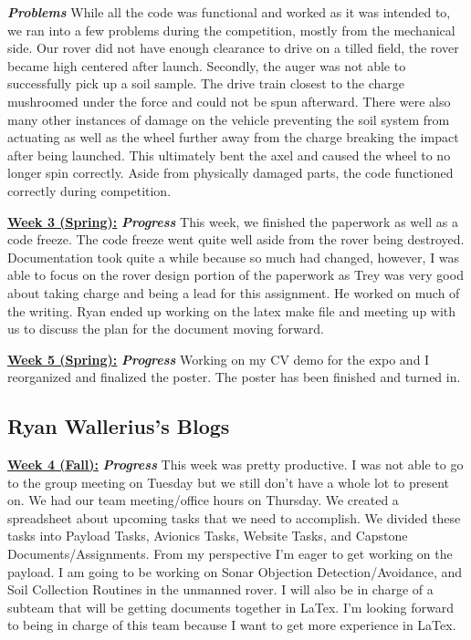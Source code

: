 \documentclass[onecolumn, draftclsnofoot, 10pt, compsoc]{IEEEtran}
\begin{document}
\textbf{\textit{{Problems}}}
\newline While all the code was functional and worked as it was intended to, we ran into a few problems during the competition, mostly from the mechanical side. Our rover did not have enough clearance to drive on a tilled field, the rover became high centered after launch. Secondly, the auger was not able to successfully pick up a soil sample. The drive train closest to the charge mushroomed under the force and could not be spun afterward. There were also many other instances of damage on the vehicle preventing the soil system from actuating as well as the wheel further away from the charge breaking the impact after being launched. This ultimately bent the axel and caused the wheel to no longer spin correctly. Aside from physically damaged parts, the code functioned correctly during competition. \newline


\underline{\textbf{Week 3 (Spring):}}
\newline\textbf{\textit{{Progress}}}
\newline This week, we finished the paperwork as well as a code freeze. The code freeze went quite well aside from the rover being destroyed. Documentation took quite a while because so much had changed, however, I was able to focus on the rover design portion of the paperwork as Trey was very good about taking charge and being a lead for this assignment. He worked on much of the writing. Ryan ended up working on the latex make file and meeting up with us to discuss the plan for the document moving forward. \newline 

\underline{\textbf{Week 5 (Spring):}}
\newline\textbf{\textit{{Progress}}}
\newline Working on my CV demo for the expo and I reorganized and finalized the poster. The poster has been finished and turned in. \newline 

\subsection{Ryan Wallerius's Blogs}
\underline{\textbf{Week 4 (Fall):}}
\newline\textbf{\textit{{Progress}}} 
\newline This week was pretty productive. I was not able to go to the group meeting on Tuesday but we still don't have a whole lot to present on. We had our team meeting/office hours on Thursday. We created a spreadsheet about upcoming tasks that we need to accomplish. We divided these tasks into Payload Tasks, Avionics Tasks, Website Tasks, and Capstone Documents/Assignments. From my perspective I'm eager to get working on the payload. I am going to be working on Sonar Objection Detection/Avoidance, and Soil Collection Routines in the unmanned rover. I will also be in charge of a subteam that will be getting documents together in LaTex. I'm looking forward to being in charge of this team because I want to get more experience in LaTex. \newline 
\end{document}
